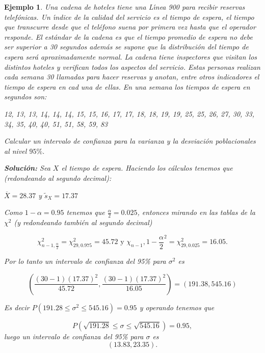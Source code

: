 \documentclass[12pt]{report}
\newtheorem{example}[definition]{Ejemplo}
\begin{document}
\begin{example}
Una cadena de hoteles tiene una \emph{L\'{\i}nea 900} para recibir reservas telef\'onicas. Un
\'{\i}ndice de la calidad del servicio es el tiempo de espera, el tiempo que transcurre desde
que el tel\'efono suena por primera vez hasta que el operador responde. El est\'andar de la
cadena es que el tiempo promedio de espera no debe ser superior a 30 segundos adem\'as se
supone que la distribuci\'on del tiempo de espera ser\'a aproximadamente normal. La cadena
tiene inspectores que  visitan los distintos hoteles y verifican todos los aspectos del
servicio. Estas personas realizan cada semana 30 llamadas para hacer reservas y anotan,
entre otros indicadores el tiempo de espera en cad una de ellas. En una semana los tiempos
de espera en segundos son:

12, 13, 13, 14, 14, 14, 15, 15, 16, 17, 17, 18, 18, 19, 19, 25, 25, 26, 27, 30, 33, 34, 35,
40, 40, 51, 51, 58, 59, 83

Calcular un intervalo de confianza para la varianza  y la desviaci\'on poblacionales al nivel
$95\%$.

\textbf{Soluci\'on:} Sea $X$ el tiempo de espera. Haciendo los c\'alculos tenemos que
(redondeando al segundo decimal):

$\overline{X}= 28.37$ y $\tilde{s}_{X}=17.37$

Como $1-\alpha=0.95$ tenemos que  $\frac{\alpha}{2}=0.025$, entonces mirando en las tablas
de la $\chi^2$ (y redondeando tambi\'en al segundo decimal)

$$\chi_{n-1,\frac{\alpha}{2}}^2= \chi_{29,0.975}^2=45.72\mbox{ y }
\chi_{n-1},1-\frac{\alpha}{2}^2= \chi_{29,0.025}^2=16.05.$$

Por lo tanto un intervalo de confianza del 95\% para $\sigma^2$ es

$$\left(\frac{(30-1) (17.37)^2}{45.72},\frac{(30-1) (17.37)^2}{16.05}\right)=
\left(191.38,545.16\right)$$

Es decir $P(191.28\leq \sigma^2\leq 545.16)=0.95$ y operando tenemos que

$$P(\sqrt{191.28}\leq\sigma\leq\sqrt{545.16})=0.95,$$ luego un intervalo de confianza del
95\% para $\sigma$ es $$\left(13.83 ,23.35\right).$$
\end{example}




\end{document}
